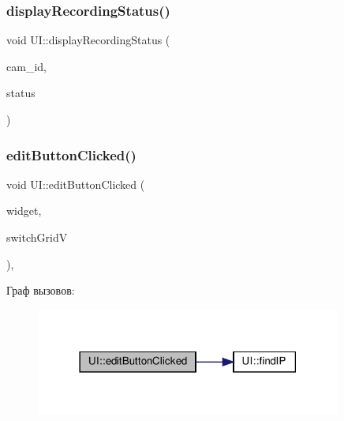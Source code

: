\mbox{\label{class_u_i_ad860928c87b2a7f4e18b3f6e15774dd3}} 
\subsubsection{\texorpdfstring{display\+Recording\+Status()}{displayRecordingStatus()}}
{\footnotesize\ttfamily void U\+I\+::display\+Recording\+Status (\begin{DoxyParamCaption}\item[{string}]{cam\+\_\+id,  }\item[{bool}]{status }\end{DoxyParamCaption})}

\mbox{\label{class_u_i_a2dfc8b3ab8c46094cabe6c8c332174cd}} 
\subsubsection{\texorpdfstring{edit\+Button\+Clicked()}{editButtonClicked()}}
{\footnotesize\ttfamily void U\+I\+::edit\+Button\+Clicked (\begin{DoxyParamCaption}\item[{Gtk\+Widget $\ast$}]{widget,  }\item[{vector$<$ Gtk\+Widget $\ast$$>$ $\ast$}]{switch\+GridV }\end{DoxyParamCaption})\hspace{0.3cm}{\ttfamily [static]}, {\ttfamily [private]}}

Граф вызовов\+:\nopagebreak
\begin{figure}[H]
\begin{center}
\leavevmode
\includegraphics[width=285pt]{class_u_i_a2dfc8b3ab8c46094cabe6c8c332174cd_cgraph}
\end{center}
\end{figure}
\mbox{\label{class_u_i_aa7991c3483e84d5ed9f64eeb333c9e44}} 
